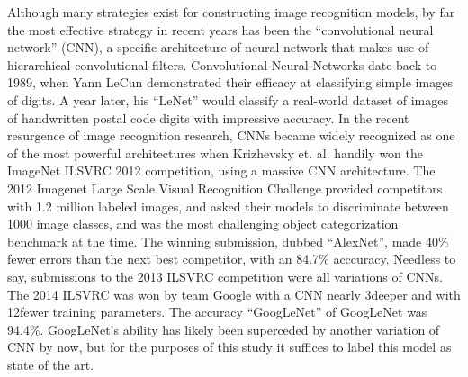 \documentclass[midd]{thesis}
\begin{document}
Although many strategies exist for constructing image recognition models, by far the most effective strategy in recent years has been the ``convolutional neural network'' (CNN), a specific architecture of neural network that makes use of hierarchical convolutional filters. Convolutional Neural Networks date back to 1989, when Yann LeCun demonstrated their efficacy at classifying simple images of digits\cite{lecun1989generalization}. A year later, his ``LeNet'' would classify a real-world dataset of images of handwritten postal code digits with impressive accuracy\cite{Cun90handwrittendigit}. In the recent resurgence of image recognition research, CNNs became widely recognized as one of the most powerful architectures when Krizhevsky et. al. \cite{NIPS2012_4824} handily won the ImageNet ILSVRC 2012 competition, using a massive CNN architecture. The 2012 Imagenet Large Scale Visual Recognition Challenge provided competitors with 1.2 million labeled images, and asked their models to discriminate between 1000 image classes, and was the most challenging object categorization benchmark at the time. The winning submission, dubbed ``AlexNet'', made 40\% fewer errors than the next best competitor, with an 84.7\% acccuracy. Needless to say, submissions to the 2013 ILSVRC competition were all variations of CNNs. The 2014 ILSVRC was won by team Google with a CNN nearly 3\times deeper and with 12\times fewer training parameters. The accuracy ``GoogLeNet'' of GoogLeNet was 94.4\%. GoogLeNet's ability has likely been superceded by another variation of CNN by now, but for the purposes of this study it suffices to label this model as state of the art.

\end{document}
